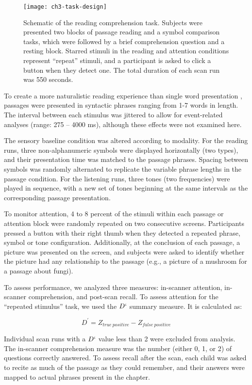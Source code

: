 \begin{figure}[t]
	\centering
	\texttt{[image: ch3-task-design]}
	\caption[Schematic of the reading comprehension task.]{Schematic of the reading comprehension task. Subjects were presented two blocks of passage reading and a symbol comparison tasks, which were followed by a brief comprehension question and a resting block. Starred stimuli in the reading and attention conditions represent ``repeat'' stimuli, and a participant is asked to click a button when they detect one. The total duration of each scan run was 550 seconds.}
	\label{fig:ch3-task-design}
\end{figure}

To create a more naturalistic reading experience than single word presentation \citep{Rayner1998}, passages were presented in syntactic phrases ranging from 1-7 words in length. The interval between each stimulus was jittered to allow for event-related analyses (range: 275 – 4000 ms), although these effects were not examined here.

The sensory baseline condition was altered according to modality. For the reading runs, three non-alphanumeric symbols were displayed horizontally (two types), and their presentation time was matched to the passage phrases. Spacing between symbols was randomly alternated to replicate the variable phrase lengths in the passage condition. For the listening runs, three tones (two frequencies) were played in sequence, with a new set of tones beginning at the same intervals as the corresponding passage presentation. 

To monitor attention, 4 to 8 percent of the stimuli within each passage or attention block were randomly repeated on two consecutive screens.  Participants pressed a button with their right thumb when they detected a repeated phrase, symbol or tone configuration. Additionally, at the conclusion of each passage, a picture was presented on the screen, and subjects were asked to identify whether the picture had any relationship to the passage (e.g., a picture of a mushroom for a passage about fungi). 

To assess performance, we analyzed three measures: in-scanner attention, in-scanner comprehension, and post-scan recall. To assess attention for the ``repeated stimulus'' task, we used the $D`$ summary measure. It is calculated as:

$$
D^\prime = Z_{true\ positive} - Z_{false\ positive}
$$

Individual scan runs with a $D`$ value less than 2 were excluded from analysis. The in-scanner comprehension measure was the number (either 0, 1, or 2) of questions correctly answered. To assess recall after the scan, each child was asked to recite as much of the passage as they could remember, and their answers were mapped to actual phrases present in the chapter. 

